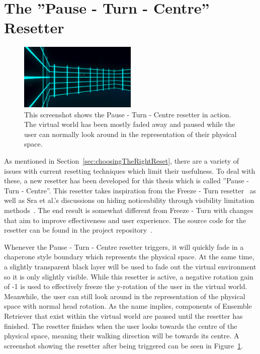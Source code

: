 \section{The ''Pause - Turn - Centre'' Resetter}\label{sec:pauseturncentre}
\begin{figure}[htbp]
  \centering
  \includegraphics[width=0.5\textwidth]{figures/screenshots/pauseTurnCentreExample.png}
  \caption[Pause - Turn - Centre Screenshot]{This screenshot shows the Pause - Turn - Centre resetter in action. The virtual world has been mostly faded away and paused while the user can normally look around in the representation of their physical space.}
  \label{fig:pauseTurnCentreExample}
\end{figure}

As mentioned in Section~\ref{sec:choosingTheRightReset}, there are a variety of issues with current resetting techniques which limit their usefulness. To deal with these, a new resetter has been developed for this thesis which is called ''Pause - Turn - Centre''. This resetter takes inspiration from the Freeze - Turn resetter~\cite{williams2007exploring} as well as Sra et al.'s discussions on hiding noticeability through visibility limitation methods~\cite{sra2018vmotion}. The end result is somewhat different from Freeze - Turn with changes that aim to improve effectiveness and user experience. The source code for the resetter can be found in the project repository~\cite{pauseTurnCentre}.

Whenever the Pause - Turn - Centre resetter triggers, it will quickly fade in a chaperone style boundary which represents the physical space. At the same time, a slightly transparent black layer will be used to fade out the virtual environment so it is only slightly visible. While this resetter is active, a negative rotation gain of -1 is used to effectively freeze the y-rotation of the user in the virtual world. Meanwhile, the user can still look around in the representation of the physical space with normal head rotation. As the name implies, components of Ensemble Retriever that exist within the virtual world are paused until the resetter has finished. The resetter finishes when the user looks towards the centre of the physical space, meaning their walking direction will be towards its centre. A screenshot showing the resetter after being triggered can be seen in Figure~\ref{fig:pauseTurnCentreExample}.

